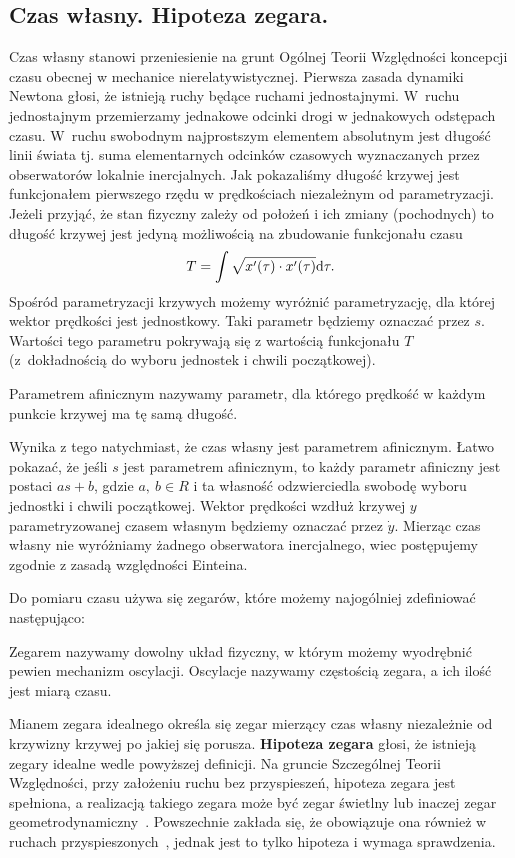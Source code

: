 \subsection{Czas własny. Hipoteza zegara.}
Czas własny stanowi przeniesienie na grunt Ogólnej Teorii Względności 
koncepcji czasu obecnej w mechanice nierelatywistycznej.
Pierwsza zasada dynamiki Newtona głosi, że istnieją ruchy będące ruchami
jednostajnymi.  W~ruchu jednostajnym przemierzamy 
jednakowe odcinki drogi w jednakowych odstępach czasu. 
W~ruchu swobodnym najprostszym elementem absolutnym jest 
długość linii świata tj. suma elementarnych 
odcinków czasowych wyznaczanych przez obserwatorów
lokalnie inercjalnych. Jak pokazaliśmy długość krzywej jest
funkcjonałem pierwszego rzędu w prędkościach niezależnym 
od parametryzacji. Jeżeli przyjąć, że stan fizyczny zależy 
od położeń i ich zmiany (pochodnych) to długość krzywej jest 
jedyną możliwością na zbudowanie funkcjonału czasu
\begin{align*}
T = \int \sqrt{x'(\tau) \cdot x'(\tau)} \text{d} \tau.
\end{align*}
Spośród parametryzacji krzywych 
 możemy wyróżnić parametryzację, 
dla której wektor prędkości jest 
jednostkowy. Taki parametr będziemy oznaczać przez $s$. 
Wartości tego parametru pokrywają się z wartością funkcjonału $T$
(z~dokładnością do wyboru jednostek i chwili początkowej). 
\begin{definition}
Parametrem afinicznym nazywamy parametr, dla którego 
prędkość w każdym punkcie krzywej ma tę samą długość.
\end{definition}
Wynika z tego natychmiast, że czas własny jest parametrem afinicznym.
Łatwo pokazać, że jeśli $s$ jest 
parametrem afinicznym, to każdy parametr afiniczny 
jest postaci $a s+b$, gdzie $a,\ b\in R$ i ta własność odzwierciedla
swobodę wyboru jednostki i chwili początkowej.
Wektor prędkości wzdłuż krzywej $y$ parametryzowanej czasem 
własnym będziemy oznaczać przez $\dot{y}$.
Mierząc czas własny nie wyróżniamy żadnego obserwatora inercjalnego,
 wiec postępujemy zgodnie z zasadą względności Einteina. 

Do pomiaru czasu używa się zegarów, które możemy 
najogólniej zdefiniować następująco:
\begin{definition}
Zegarem nazywamy dowolny układ fizyczny, w którym możemy wyodrębnić pewien
mechanizm oscylacji. Oscylacje nazywamy częstością zegara, a ich ilość jest
miarą czasu.
\end{definition}
Mianem zegara idealnego określa się zegar mierzący czas własny
niezależnie od krzywizny krzywej po jakiej się porusza.
\textbf{Hipoteza zegara} głosi, że istnieją zegary idealne wedle 
powyższej definicji.
Na gruncie Szczególnej Teorii Względności, przy założeniu ruchu
bez przyspieszeń, hipoteza zegara jest spełniona, a 
realizacją takiego zegara może być zegar świetlny lub inaczej
zegar geometrodynamiczny~\cite{ohanian2013gravitation}.
Powszechnie zakłada się, że obowiązuje 
ona również w ruchach przyspieszonych~\cite{trau1984},
jednak jest to tylko hipoteza i wymaga sprawdzenia.

